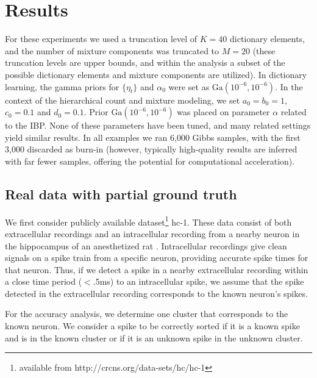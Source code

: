 \documentclass[journal]{IEEEtran}
\begin{document}
\section{Results\label{sec:results}}

For these experiments we used a truncation level of
$K=40$ dictionary elements, and the number of mixture components was
truncated to $M=20$ (these truncation levels are upper bounds, and within the analysis a subset of the possible dictionary elements and mixture components are utilized).  In dictionary learning, the gamma priors for
$\{\eta_t\}$ and $\alpha_0$ were set as
$\mbox{Ga}(10^{-6},10^{-6})$. In the context of the hierarchical
count and mixture modeling, we set $a_0=b_0=1$, $c_0=0.1$ and
$d_0=0.1$. Prior $\mbox{Ga}(10^{-6},10^{-6})$ was placed on
parameter $\alpha$ related to the IBP. None of these parameters have
been tuned, and many related settings yield similar results. In all
examples we ran 6,000 Gibbs samples, with the first 3,000 discarded
as burn-in (however, typically high-quality results are inferred with far fewer samples, offering the potential for computational acceleration).

\subsection{Real data with partial ground truth\label{sec:truth}} We
first consider publicly available dataset\footnote{available from
http://crcns.org/data-sets/hc/hc-1} hc-1. These data consist of both
extracellular recordings and an intracellular recording from a
nearby neuron in the hippocampus of an anesthetized rat
\cite{Henze2000}.  Intracellular recordings give clean signals on a
spike train from a specific neuron, providing accurate spike times for
that neuron.  Thus, if we detect a spike in a nearby extracellular
recording within a close time period ($<$.5ms) to an intracellular
spike, we assume that the spike detected in the extracellular
recording corresponds to the known neuron's spikes.

For the accuracy analysis, we determine one cluster that corresponds to the
known neuron.  We consider a spike to be correctly sorted if
it is a known spike and is in the known cluster or if it is an
unknown spike in the unknown cluster.
\end{document}
